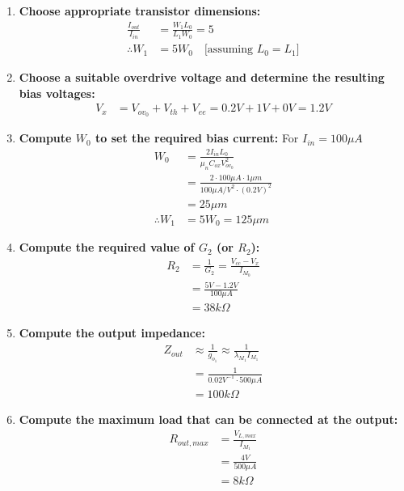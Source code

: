 \begin{enumerate}
  \item \textbf{Choose appropriate transistor dimensions:}
    \begin{align*}
      \frac{I_{out}}{I_{in}} &= \frac{W_1 L_0}{L_1 W_0} = 5 \\
      \therefore W_1 &= 5 W_0 \quad \text{[assuming } L_0 = L_1 \text{]}
    \end{align*}
  \item \textbf{Choose a suitable overdrive voltage and determine
    the resulting bias voltages:}
    \begin{align*}
      V_{x} &= V_{ov_0} + V_{th} + V_{ee} = 0.2V + 1V + 0V = 1.2V
    \end{align*}
  \item \textbf{Compute $W_0$ to set the required bias current:} For $I_{in} = 100 \mu A$
    \begin{align*}
      W_0 &= \frac{2 I_{in} L_0}{\mu_n C_{ox} V_{ov_0}^2} \\
          &= \frac{2 \cdot 100 \mu A \cdot 1 \mu m}{100 \mu A/V^2 \cdot (0.2V)^2} \\
          &= 25 \mu m \\
      \therefore W_1 &= 5 W_0 = 125 \mu m
    \end{align*}
  \item \textbf{Compute the required value of $G_2$ (or $R_2$):}
    \begin{align*}
      R_2 &= \frac{1}{G_2} = \frac{V_{cc} - V_{x}}{I_{M_0}} \\
          &= \frac{5V - 1.2V}{100 \mu A} \\
          &= 38 k\Omega
    \end{align*}
  \item \textbf{Compute the output impedance:}
    \begin{align*}
      Z_{out} &\approx \frac{1}{g_{o_1}} \approx \frac{1}{\lambda_{M_1} I_{M_1}} \\
              &= \frac{1}{0.02 V^{-1} \cdot 500 \mu A} \\
              &= 100 k\Omega
    \end{align*}
  \item \textbf{Compute the maximum load that can be connected
    at the output:}
    \begin{align*}
      R_{out, max} &= \frac{V_{L, max}}{I_{M_1}} \\
                   &= \frac{4V}{500 \mu A} \\
                   &= 8 k\Omega
    \end{align*}
\end{enumerate}

